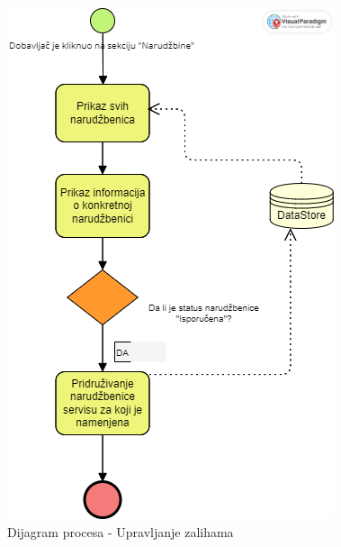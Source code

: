 \documentclass[a4paper]{article}
\begin{document}
\begin{figure}[H]
\begin{center}
\includegraphics[scale=0.5]{Dijagrami/BPMN_Dijagrami/BPMN_dijagram_procesa_upravljanje_narudzbenicama.png}
\end{center}
\caption{Dijagram procesa - Upravljanje zalihama}
\label{fig:BPMN_upravljanje_zalihama}
\end{figure}
\end{document}
